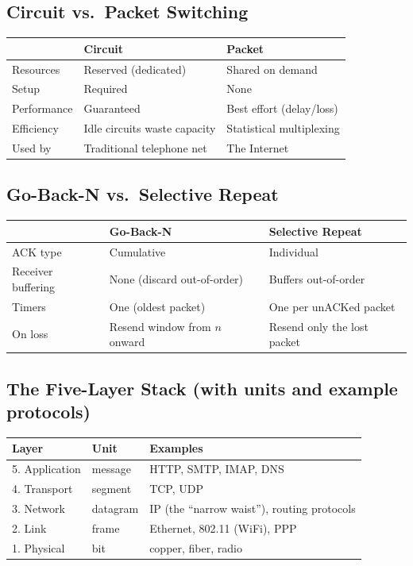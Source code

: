 \documentclass[hidelinks]{article}
\begin{document}
\subsection{Circuit vs.\ Packet Switching}

\noindent\begin{tabularx}{\textwidth}{|l|X|X|}
\hline
 & \textbf{Circuit} & \textbf{Packet} \\
\hline
Resources & Reserved (dedicated) & Shared on demand \\
\hline
Setup & Required & None \\
\hline
Performance & Guaranteed & Best effort (delay/loss) \\
\hline
Efficiency & Idle circuits waste capacity & Statistical multiplexing \\
\hline
Used by & Traditional telephone net & The Internet \\
\hline
\end{tabularx}

\subsection{Go-Back-N vs.\ Selective Repeat}

\noindent\begin{tabularx}{\textwidth}{|l|X|X|}
\hline
 & \textbf{Go-Back-N} & \textbf{Selective Repeat} \\
\hline
ACK type & Cumulative & Individual \\
\hline
Receiver buffering & None (discard out-of-order) & Buffers out-of-order \\
\hline
Timers & One (oldest packet) & One per unACKed packet \\
\hline
On loss & Resend window from $n$ onward & Resend only the lost packet \\
\hline
\end{tabularx}

\subsection{The Five-Layer Stack (with units and example protocols)}

\noindent\begin{tabularx}{\textwidth}{|l|l|X|}
\hline
\textbf{Layer} & \textbf{Unit} & \textbf{Examples} \\
\hline
5. Application & message  & HTTP, SMTP, IMAP, DNS \\
\hline
4. Transport   & segment  & TCP, UDP \\
\hline
3. Network     & datagram & IP (the ``narrow waist''), routing protocols \\
\hline
2. Link        & frame    & Ethernet, 802.11 (WiFi), PPP \\
\hline
1. Physical    & bit      & copper, fiber, radio \\
\hline
\end{tabularx}
\end{document}
